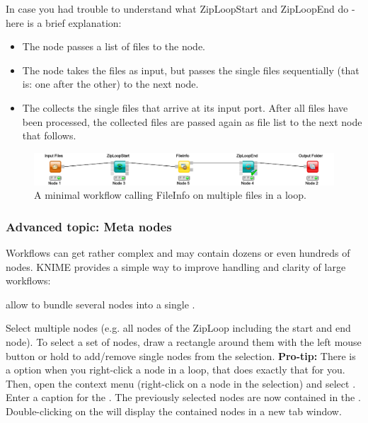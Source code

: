 In case you had trouble to understand what ZipLoopStart and ZipLoopEnd do - here is a brief explanation:
\begin{itemize}
\item
The   node passes a list of files to the  node.
\item
The  node takes the files as input, but passes the single files sequentially (that is: one after the other) to the next node. 
\item
The  collects the single files that arrive at its input port. After all files have been processed, the collected files are passed again as file list to the next node that follows.
\end{itemize}

\begin{figure}
\centering
\includegraphics[width=\textwidth]{graphics/knime_setup/Minimal_FileInfoLoop}
\caption{A minimal workflow calling FileInfo on multiple files in a loop.}
\label{fig:knime_minimal_loop}
\end{figure}

\subsubsection{Advanced topic: Meta nodes}

Workflows can get rather complex and may contain dozens or even hundreds of nodes. KNIME provides a simple way to improve handling and clarity of large workflows:

 allow to bundle several nodes into a single .

\begin{task}
Select multiple nodes (e.g. all nodes of the ZipLoop including the start and end node). To select a set of nodes, draw a rectangle around them with the left mouse button or hold  to add/remove single nodes from the selection. \textbf{Pro-tip:} There is a  option when you right-click a node in a loop, that does exactly that for you. Then, open the context menu (right-click on a node in the selection) and select . Enter a caption for the . The previously selected nodes are now contained in the . Double-clicking on the  will display the contained nodes in a new tab window. 
\end{task}


